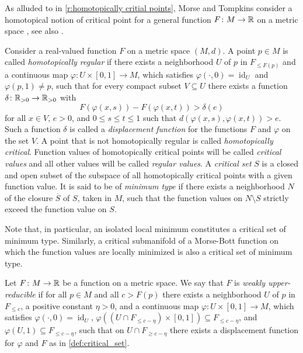 As alluded to in \cref{r:homotopically critial points}, Morse and Tompkins consider a homotopical notion of critical point for a general function $F \colon M \to \mathbb{R}$ on a metric space \cite[p.~445]{Morse.1939}, see also \cite{Morse.1943}.

\begin{defi}
\label{def:critical_set}
	Consider a real-valued function $F$ on a metric space $(M,d)$.
	A point $p \in M$ is called \emph{homotopically regular} if there exists a neighborhood $U$ of $p$ in $F_{\leq F(p)}$ and a continuous map $\varphi \colon U \times [0,1] \to M$, which satisfies $\varphi(\cdot, 0) = \operatorname{id}_U$ and $\varphi(p,1) \neq p$, such that for every compact subset $V \subseteq U$ there exists a function $\delta \colon \mathbb{R}_{> 0} \to \mathbb{R}_{> 0}$ with
	\[
	F(\varphi(x,s)) - F(\varphi(x,t)) > \delta(e)
	\]
	for all $x \in V$, $e > 0$, and $0 \leq s \leq t \leq 1$ such that $d(\varphi(x,s),\varphi(x,t)) > e$.
	Such a function $\delta$ is called a \emph{displacement function} for the functions $F$ and $\varphi$ on the set $V$.
	A point that is not homotopically regular is called \emph{homotopically critical}.
	Function values of homotopically critical points will be called \emph{critical values} and all other values will be called \emph{regular values}.
	A \emph{critical set} $S$ is a closed and open subset of the subspace of all homotopically critical points with a given function value.
	It is said to be of \emph{minimum type} if there exists a neighborhood $N$ of the closure $\overline{S}$ of $S$, taken in $M$, such that the function values on $N \setminus S$ strictly exceed the function value on $S$.
\end{defi}

Note that, in particular, an isolated local minimum constitutes a critical set of minimum type. Similarly, a critical submanifold of a Morse-Bott function on which the function values are locally minimized is also a critical set of minimum type.

\begin{defi}
\label{def:upper_reducible}
	Let $F \colon M \to \mathbb{R}$ be a function on a metric space.
	We say that $F$ is \emph{weakly upper-reducible} if for all $p \in M$ and all $c > F(p)$ there exists a neighborhood $U$ of $p$ in $F_{\leq c}$, a positive constant $\eta > 0$, and a continuous map $\varphi \colon U \times [0,1] \to M$, which satisfies $\varphi(\cdot, 0) = \operatorname{id}_U$, $\varphi((U \cap F_{\leq c-\eta}) \times [0,1]) \subseteq F_{\leq c-\eta}$, and $\varphi(U,1) \subseteq F_{\leq c-\eta}$, such that on %
	$U \cap F_{\geq c - \eta}$ there exists a displacement function for $\varphi$ and $F$ as in \cref{def:critical_set}.
\end{defi}

